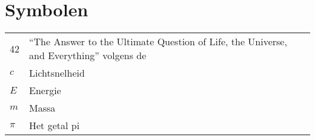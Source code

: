 \documentclass[master=elt,masteroption=ge]{kulemt}
\begin{document}
\section*{Symbolen}
\begin{flushleft}
  \renewcommand{\arraystretch}{1.1}
  \begin{tabularx}{\textwidth}{@{}p{22mm}X@{}}
    42    & ``The Answer to the Ultimate Question of Life, the Universe,
            and Everything'' volgens de \cite{h2g2} \\
    $c$   & Lichtsnelheid \\
    $E$   & Energie \\
    $m$   & Massa \\
    $\pi$ & Het getal pi \\
  \end{tabularx}
\end{flushleft}

\newcommand{\comp}[1]{\textsc{#1}}

\mainmatter







\appendixpage*          %
\appendix



\backmatter


\end{document}
